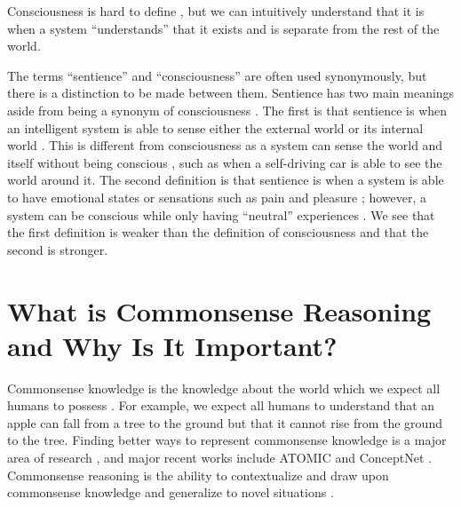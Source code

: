 \documentclass[12pt]{report}
\begin{document}
Consciousness is hard to define \cite{Butlin2023-jm}, but we can intuitively understand that it is when a system \enquote{understands} that it exists and is separate from the rest of the world.

The terms \enquote{sentience} and \enquote{consciousness} are often used synonymously, but there is a distinction to be made between them.
Sentience has two main meanings aside from being a synonym of consciousness \cite{Butlin2023-jm}.
The first is that sentience is when an intelligent system is able to sense either the external world or its internal world \cite{Butlin2023-jm}.
This is different from consciousness as a system can sense the world and itself without being conscious \cite{Butlin2023-jm}, such as when a self-driving car is able to see the world around it.
The second definition is that sentience is when a system is able to have emotional states or sensations such as pain and pleasure \cite{Butlin2023-jm}; however, a system can be conscious while only having \enquote{neutral} experiences \cite{Butlin2023-jm}.
We see that the first definition is weaker than the definition of consciousness and that the second is stronger.

\section{What is Commonsense Reasoning and Why Is It Important?}

Commonsense knowledge is the knowledge about the world which we expect all humans to possess \cite{Ilievski2021-ir}.
For example, we expect all humans to understand that an apple can fall from a tree to the ground but that it cannot rise from the ground to the tree.
Finding better ways to represent commonsense knowledge is a major area of research \cite{Ilievski2021-ir}, and major recent works include ATOMIC \cite{Sap2019-ob} and ConceptNet \cite{Speer2017-vu}.
Commonsense reasoning is the ability to contextualize and draw upon commonsense knowledge and generalize to novel situations \cite{Singh2021-ui}.
\end{document}
